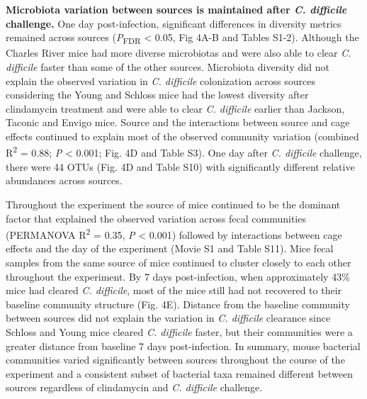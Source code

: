 \documentclass[
  11pt,
]{article}
\begin{document}
\textbf{Microbiota variation between sources is maintained after
\emph{C. difficile} challenge.} One day post-infection, significant
differences in diversity metrics remained across sources
(\emph{P}\textsubscript{FDR} \textless{} 0.05, Fig 4A-B and Tables
S1-2). Although the Charles River mice had more diverse microbiotas and
were also able to clear \emph{C. difficile} faster than some of the
other sources. Microbiota diversity did not explain the observed
variation in \emph{C. difficile} colonization across sources considering
the Young and Schloss mice had the lowest diversity after clindamycin
treatment and were able to clear \emph{C. difficile} earlier than
Jackson, Taconic and Envigo mice. Source and the interactions between
source and cage effects continued to explain most of the observed
community variation (combined R\textsuperscript{2} = 0.88; \emph{P}
\textless{} 0.001; Fig. 4D and Table S3). One day after \emph{C.
difficile} challenge, there were 44 OTUs (Fig. 4D and Table S10) with
significantly different relative abundances across sources.

Throughout the experiment the source of mice continued to be the
dominant factor that explained the observed variation across fecal
communities (PERMANOVA R\textsuperscript{2} = 0.35, \emph{P} \textless{}
0.001) followed by interactions between cage effects and the day of the
experiment (Movie S1 and Table S11). Mice fecal samples from the same
source of mice continued to cluster closely to each other throughout the
experiment. By 7 days post-infection, when approximately 43\% mice had
cleared \emph{C. difficile}, most of the mice still had not recovered to
their baseline community structure (Fig. 4E). Distance from the baseline
community between sources did not explain the variation in \emph{C.
difficile} clearance since Schloss and Young mice cleared \emph{C.
difficile} faster, but their communities were a greater distance from
baseline 7 days post-infection. In summary, mouse bacterial communities
varied significantly between sources throughout the course of the
experiment and a consistent subset of bacterial taxa remained different
between sources regardless of clindamycin and \emph{C. difficile}
challenge.
\end{document}
